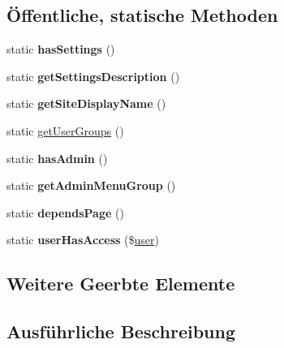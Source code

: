 \subsection*{Öffentliche, statische Methoden}
\begin{DoxyCompactItemize}
\item 
\mbox{\label{classbeurlaubungantrag_aee16cc9a58721de1ff73abc31d0c475e}} 
static {\bfseries has\+Settings} ()
\item 
\mbox{\label{classbeurlaubungantrag_a7f340691168784cf4b642a3af86e9e1e}} 
static {\bfseries get\+Settings\+Description} ()
\item 
\mbox{\label{classbeurlaubungantrag_a5400efd2b568295982e03de8732cd088}} 
static {\bfseries get\+Site\+Display\+Name} ()
\item 
static \mbox{\hyperlink{classbeurlaubungantrag_ac839672f786681521a02fafd6077351f}{get\+User\+Groups}} ()
\item 
\mbox{\label{classbeurlaubungantrag_aed750fb1bf096ade20e9d4850d0b49bd}} 
static {\bfseries has\+Admin} ()
\item 
\mbox{\label{classbeurlaubungantrag_a681b98b356a6dfb75f0c5842fbea81f0}} 
static {\bfseries get\+Admin\+Menu\+Group} ()
\item 
\mbox{\label{classbeurlaubungantrag_a705d5001d2d884a4298ba8c66ee0b721}} 
static {\bfseries depends\+Page} ()
\item 
\mbox{\label{classbeurlaubungantrag_a15b8701405e15d1662ea33228618b730}} 
static {\bfseries user\+Has\+Access} (\$\mbox{\hyperlink{classuser}{user}})
\end{DoxyCompactItemize}
\subsection*{Weitere Geerbte Elemente}


\subsection{Ausführliche Beschreibung}



